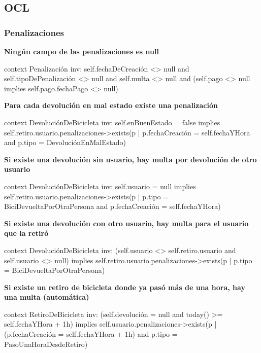 \documentclass[a4paper, 10pt, twoside]{article}
\newenvironment{ocl}[1]
  {
    \textbf{#1}
    \verbatim
  }{
    \endverbatim
  }
\begin{document}
\subsection{OCL}


\subsubsection{Penalizaciones}

\begin{ocl}{Ningún campo de las penalizaciones es null}
  context Penalización
  inv: self.fechaDeCreación <> null and
       self.tipoDePenalización <> null and
       self.multa <> null and
       (self.pago <> null implies self.pago.fechaPago <> null)
\end{ocl}

\begin{ocl}{Para cada devolución en mal estado existe una penalización}
  context DevoluciónDeBicicleta
  inv: self.enBuenEstado = false implies
           self.retiro.usuario.penalizaciones->exists(p |
               p.fechaCreación = self.fechaYHora and
               p.tipo = DevoluciónEnMalEstado)
\end{ocl}

\begin{ocl}{Si existe una devolución sin usuario, hay multa por devolución de otro usuario}
  context DevoluciónDeBicicleta
  inv: self.usuario = null implies
           self.retiro.usuario.penalizaciones->exists(p |
               p.tipo = BiciDevueltaPorOtraPersona and
               p.fechaCreación = self.fechaYHora)
\end{ocl}

\begin{ocl}{Si existe una devolución con otro usuario, hay multa para el usuario que la retiró}
  context DevoluciónDeBicicleta
  inv: (self.usuario <> self.retiro.usuario and self.usuario <> null) implies
           self.retiro.usuario.penalizaciones->exists(p |
               p.tipo = BiciDevueltaPorOtraPersona)
\end{ocl}

\begin{ocl}{Si existe un retiro de bicicleta donde ya pasó más de una hora, hay una multa (automática)}
  context RetiroDeBicicleta
  inv: (self.devolución = null and today() >= self.fechaYHora + 1h) implies
           self.usuario.penalizaciones->exists(p |
               (p.fechaCreación = self.fechaYHora + 1h) and
               p.tipo = PasoUnaHoraDesdeRetiro)
\end{ocl}
\end{document}
